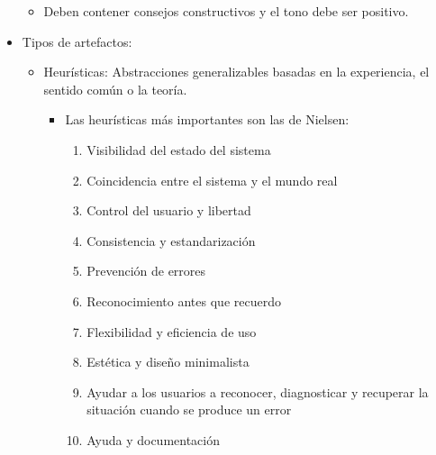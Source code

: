 \documentclass[12pt, twoside, openright]{report} %
\begin{document}
\begin{itemize}
\begin{itemize}
		      \item Deben contener consejos constructivos y el tono debe ser positivo.
	      \end{itemize}
	\item Tipos de artefactos:

	      \begin{itemize}
		      \item Heurísticas: Abstracciones generalizables basadas en la
		            experiencia, el sentido común o la teoría.

		            \begin{itemize}
			            \item Las heurísticas más importantes son las de Nielsen:

			                  \begin{enumerate}
				                  \def\labelenumi{\arabic{enumi}.}


				                  \item Visibilidad del estado del sistema

				                  \item Coincidencia entre el sistema y el mundo real

				                  \item Control del usuario y libertad

				                  \item Consistencia y estandarización

				                  \item Prevención de errores

				                  \item Reconocimiento antes que recuerdo

				                  \item Flexibilidad y eficiencia de uso

				                  \item Estética y diseño minimalista

				                  \item Ayudar a los usuarios a reconocer, diagnosticar y recuperar la
				                        situación cuando se produce un error

				                  \item Ayuda y documentación
			                  \end{enumerate}
		            \end{itemize}


\end{itemize}
\end{itemize}
\end{document}
